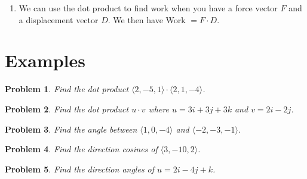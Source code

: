 \documentclass[11pt]{article}
\newtheorem{theorem}{Theorem}
\newtheorem{problem}{Problem}
\begin{document}
\begin{enumerate}
\begin{theorem}
        \begin{equation*}
            \text{comp}_ab = \frac{a\cdot b}{|a|}.
        \end{equation*}
    \end{theorem}

    \begin{theorem}
       The vector projection of $b$ onto $a$: 
    \begin{equation*}
        \text{proj}_ab = \frac{a \cdot b}{|a|^2}a
    \end{equation*}

    \end{theorem}

    \item We can use the dot product to find work when you have a force vector $F$ and a displacement vector $D$. We then have Work $= F \cdot D$.
\end{enumerate}



\section{Examples}

\begin{problem}
    Find the dot product $\langle 2,-5,1 \rangle \cdot \langle 2,1,-4 \rangle$.
\end{problem}

\vspace{2cm}


\begin{problem}
    Find the dot product $u \cdot v$ where $u = 3i+3j+3k$ and  $v=2i-2j$.
\end{problem}

\vspace{2cm}

\begin{problem}
    Find the angle between $\langle 1,0,-4 \rangle$ and $\langle -2, -3, -1 \rangle$.
\end{problem}

\vspace{6cm}

\begin{problem}
    Find the direction cosines of $\langle 3,-10,2 \rangle$.
\end{problem}

\vspace{5cm}

\begin{problem}
 Find the direction angles of $u = 2i-4j+k$.
\end{problem}
\end{document}
